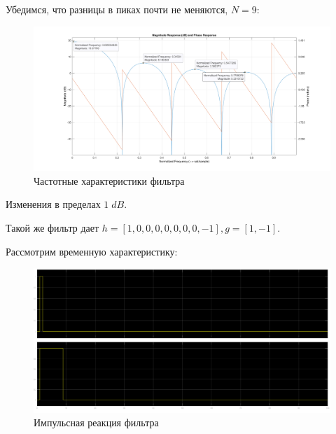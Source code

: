 \documentclass[12pt,a4paper]{article}
\begin{document}
	Убедимся, что разницы в пиках почти не меняются, $N = 9$:
	\begin{figure}[H]
		\centering
		\includegraphics[width=1.0\linewidth]{res/4_2_N9.png}
		\caption{Частотные характеристики фильтра}
	\end{figure}
	
	Изменения в пределах $1 \; dB$.
	
	Такой же фильтр дает $h = [1, 0, 0, 0, 0, 0, 0, 0, -1], g = [1, -1]$.
	
	Рассмотрим временную характеристику:
	\begin{figure}[H]
		\centering
		\includegraphics[width=1.0\linewidth]{res/4_2_impulse.png}
		\caption{Импульсная реакция фильтра}
	\end{figure}
\end{document}
